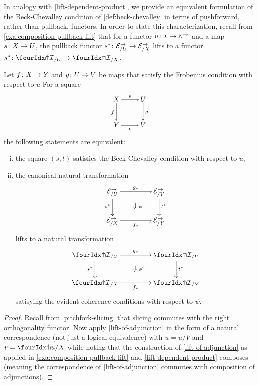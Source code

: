 \documentclass[reqno,10pt,a4paper,oneside,draft]{amsart}
\begin{document}
In analogy with \cref{lift-dependent-product}, we provide an equivalent formulation of the Beck-Chevalley condition of \cref{def:beck-chevalley} in terms of pushforward, rather than pullback, functors.
In order to state this characterization, recall from \cref{exa:composition-pullback-lift} that for a functor $u \colon \mathcal{I} \to \mathcal{E}^\to$ and a map $s \colon X \to U$, the pullback functor $s^* \colon \mathcal{E}^\to_{/U} \to \mathcal{E}^\to_{/X}$ lifts to a functor $s^* \co {\liftr{\cal{I}}}_{/U} \to {\liftr{\cal{I}}}_{/X}$.

\begin{proposition} \label{lift-pushforward-BC}
Let $f \colon X \to Y$ and $g \colon U \to V$ be maps that satisfy the Frobenius condition with respect to $u$
For a square
\[
\xymatrix{
  X
  \ar[d]_{f}
  \ar[r]^{s}
&
  U
  \ar[d]^{g}
\\
  Y
  \ar[r]_{t}
&
  V
}
\]
the following statements are equivalent:
\begin{enumerate}[(i)]
\item the square $(s,t)$ satisfies the Beck-Chevalley condition with respect to $u$,
\item the canonical natural transformation
\[
\xymatrix@C+2em{
  \catE^\to_{/U}
  \ar[r]^{g_*}
   \ar[d]_{s^*}
  \ar@{}[dr]|{\textstyle\Downarrow \rlap{$\labelstyle\phi$}}
&
\catE^\to_{/V}
 \ar[d]^{t^*}
\\
  \catE^\to_{/X}
  \ar[r]_{f_*}
&
  \catE^\to_{/Y}
}
\]
lifts to a natural transformation
\[
\xymatrix@C+2em{
  {\liftr{\cal{I}}}_{/U}
  \ar[r]^{g_*}
  \ar[d]_{s^*}
  \ar@{}[dr]|{\textstyle\Downarrow \rlap{$\labelstyle\phi'$}}
&
  {\liftr{\cal{I}}}_{/V}
  \ar[d]^{t^*}
\\
  {\liftr{\cal{I}}}_{/X}
  \ar[r]_{f_*}
&
  {\liftr{\cal{I}}}_{/Y}
}
\]
satisying the evident coherence conditions with respect to $\psi$.
\end{enumerate}
\end{proposition}

\begin{proof}
Recall from \cref{pitchfork-slicing} that slicing commutes with the right orthogonality functor.
Now apply \cref{lift-of-adjunction} in the form of a natural correspondence (not just a logical equivalence) with $u = u/V$ and $v = \liftr{u}/X$ while noting that the construction of \cref{lift-of-adjunction} as applied in \cref{exa:composition-pullback-lift} and \cref{lift-dependent-product} composes (meaning the correspondence of \cref{lift-of-adjunction} commutes with composition of adjunctions).
\end{proof}
\end{document}

